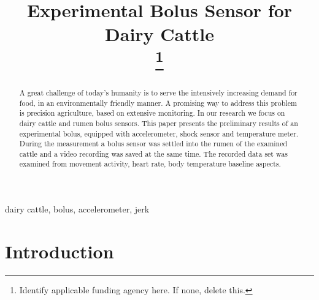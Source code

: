 \documentclass[conference]{IEEEtran}
\begin{document}
\title{Experimental Bolus Sensor for Dairy Cattle\\
\thanks{Identify applicable funding agency here. If none, delete this.}
}

\author{
\and
{}
\and
{}
}

\maketitle

\begin{abstract}
A great challenge of today's humanity is to serve the intensively
increasing demand for food, in an environmentally friendly manner.
A promising way to address this problem is precision agriculture,
based on extensive monitoring. In our research we focus on dairy
cattle and rumen bolus sensors. This paper presents the preliminary
results of an experimental bolus, equipped with accelerometer,
shock sensor and temperature meter. During the measurement a bolus sensor was settled into the rumen of the examined cattle and a video recording was saved at the same time. The recorded data set was examined from movement activity, heart rate, body temperature baseline aspects.
\end{abstract}

\begin{IEEEkeywords}
dairy cattle, bolus, accelerometer, jerk
\end{IEEEkeywords}

\section{Introduction}
\end{document}
